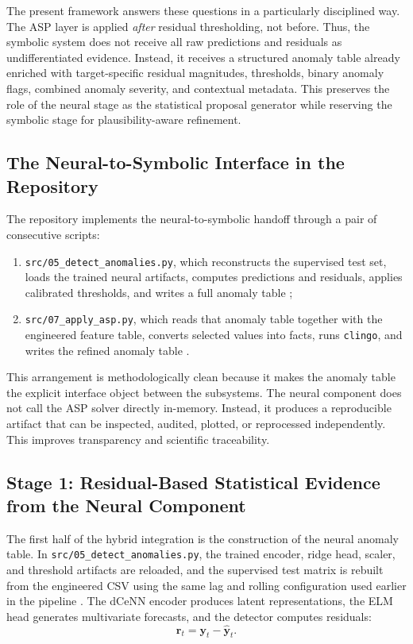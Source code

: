 The present framework answers these questions in a particularly disciplined way. The ASP layer is applied \emph{after} residual thresholding, not before. Thus, the symbolic system does not receive all raw predictions and residuals as undifferentiated evidence. Instead, it receives a structured anomaly table already enriched with target-specific residual magnitudes, thresholds, binary anomaly flags, combined anomaly severity, and contextual metadata. This preserves the role of the neural stage as the statistical proposal generator while reserving the symbolic stage for plausibility-aware refinement.

\subsection{The Neural-to-Symbolic Interface in the Repository}

The repository implements the neural-to-symbolic handoff through a pair of consecutive scripts:
\begin{enumerate}
	\item \texttt{src/05\_detect\_anomalies.py}, which reconstructs the supervised test set, loads the trained neural artifacts, computes predictions and residuals, applies calibrated thresholds, and writes a full anomaly table \cite{repo_thesis_grid_anomaly};
	\item \texttt{src/07\_apply\_asp.py}, which reads that anomaly table together with the engineered feature table, converts selected values into facts, runs \texttt{clingo}, and writes the refined anomaly table \cite{repo_thesis_grid_anomaly}.
\end{enumerate}

This arrangement is methodologically clean because it makes the anomaly table the explicit interface object between the subsystems. The neural component does not call the ASP solver directly in-memory. Instead, it produces a reproducible artifact that can be inspected, audited, plotted, or reprocessed independently. This improves transparency and scientific traceability.

\subsection{Stage 1: Residual-Based Statistical Evidence from the Neural Component}

The first half of the hybrid integration is the construction of the neural anomaly table. In \texttt{src/05\_detect\_anomalies.py}, the trained encoder, ridge head, scaler, and threshold artifacts are reloaded, and the supervised test matrix is rebuilt from the engineered CSV using the same lag and rolling configuration used earlier in the pipeline \cite{repo_thesis_grid_anomaly}. The dCeNN encoder produces latent representations, the ELM head generates multivariate forecasts, and the detector computes residuals:
\begin{equation}
	\mathbf{r}_t = \mathbf{y}_t - \hat{\mathbf{y}}_t.
	\label{eq:hybrid_residual}
\end{equation}

